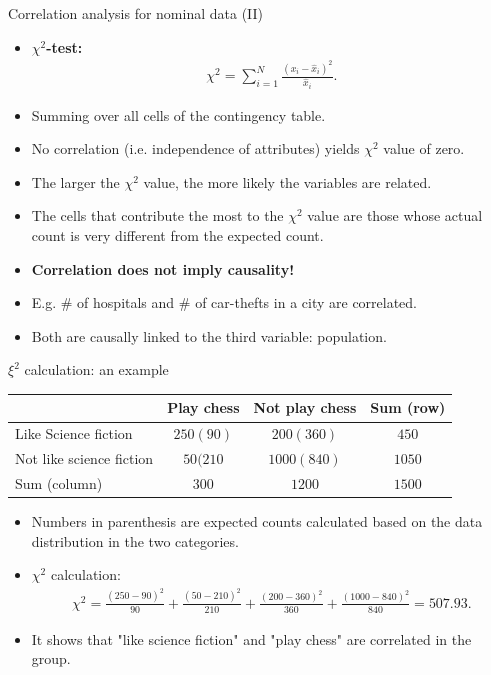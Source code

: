 \documentclass[aspectratio=169,t]{beamer}
\begin{document}
  { 
    \begin{frame}{Correlation analysis for nominal data (II)}
      \begin{itemize}
        \item \textbf{\color{airforceblue}$\chi^2$-test:}
        \begin{align}
          \chi^2 = \sum_{i=1}^{N} \frac{(x_i-\hat{x}_i)^2}{\hat{x}_i}.
        \end{align}
        \item Summing over all cells of the contingency table.
        \item No correlation (i.e. independence of attributes) yields $\chi^2$ value of zero.
        \item The larger the $\chi^2$ value, the more likely the variables are related.
        \item The cells that contribute the most to the $\chi^2$ value
are those whose actual count is very different from the expected count.
      \end{itemize}
      \begin{itemize}
        \item \textbf{Correlation does not imply causality!}
        \item E.g. $\#$ of hospitals and $\#$ of car-thefts in a city are correlated.
        \item Both are causally linked to the third variable: population.
      \end{itemize}
    \end{frame}
  }

  { 
    \begin{frame}{$\xi^2$ calculation: an example}
    \centering
    \begin{tabular}{l|c|c|c|}
    & Play chess & Not play chess & Sum (row)\\\hline
    Like Science fiction & $250 (90)$ & $200 (360)$ & $450$ \\\hline
    Not like science fiction & $50 (210$ & $1000 (840)$ & $1050$\\\hline
    Sum (column) & $300$ & $1200$ & $1500$\\\hline
    \end{tabular}
    \begin{itemize}
      \item Numbers in parenthesis are expected counts calculated based on the data distribution in the two categories.
      \item $\chi^2$ calculation:
      \begin{align}
      \chi^2 = \frac{(250-90)^2}{90} + \frac{(50-210)^2}{210} + \frac{(200-360)^2}{360} + \frac{(1000-840)^2}{840} = 507.93.
      \end{align}
      \item It shows that "like science fiction" and "play chess" are correlated in the group.
    \end{itemize}
    \end{frame}
  }
\end{document}
